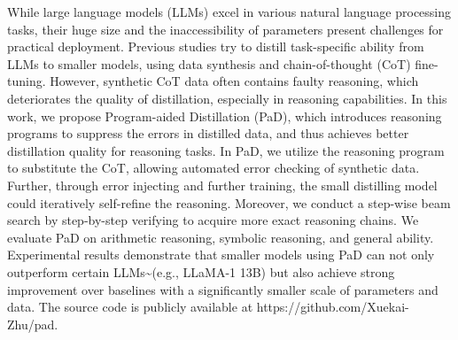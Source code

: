 While large language models (LLMs) excel in various natural language processing tasks, their huge size and the inaccessibility of parameters present challenges for practical deployment. Previous studies try to distill task-specific ability from LLMs to smaller models, using data synthesis and chain-of-thought (CoT) fine-tuning. However, synthetic CoT data often contains faulty reasoning, which deteriorates the quality of distillation, especially in reasoning capabilities. In this work, we propose Program-aided Distillation (PaD), which introduces reasoning programs to suppress the errors in distilled data, and thus achieves better distillation quality for reasoning tasks. In PaD, we utilize the reasoning program to substitute the CoT, allowing automated error checking of synthetic data. Further, through error injecting and further training, the small distilling model could iteratively self-refine the reasoning.  Moreover, we conduct a step-wise beam search by step-by-step verifying to acquire more exact reasoning chains.  We evaluate PaD on arithmetic reasoning, symbolic reasoning, and general ability. Experimental results demonstrate that smaller models using PaD can not only outperform certain LLMs\textasciitilde{}(e.g., LLaMA-1 13B) but also achieve strong improvement over  baselines with a significantly smaller scale of parameters and data.  The source code is publicly available at https://github.com/Xuekai-Zhu/pad.